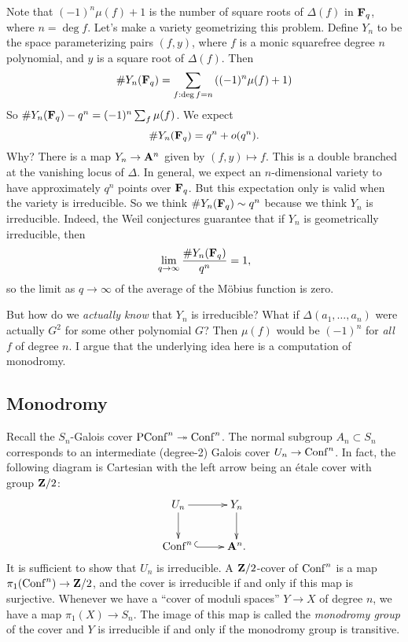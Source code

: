 Note that $(-1)^n\mu(f)+1$ is the number of square roots of $\Delta(f)$ in 
$\mathbf{F}_q$, where $n=\deg f$. Let's make a variety geometrizing this problem. 
Define $Y_n$ to be the space parameterizing pairs $(f,y)$, where $f$ is a monic 
squarefree degree $n$ polynomial, and $y$ is a square root of $\Delta(f)$. Then 
\[
  \#Y_n(\mathbf{F}_q) = \sum_{f:\deg f=n} \left((-1)^n \mu(f) + 1\right)
\]
So $\#Y_n(\mathbf{F}_q) - q^n = (-1)^n \sum_f \mu(f)$. We expect 
\[
  \# Y_n(\mathbf{F}_q) = q^n + o(q^n) .
\]
Why? There is a map $Y_n\to \mathbf{A}^n$ given by $(f,y)\mapsto f$. This is a 
double branched at the vanishing locus of $\Delta$. In general, we expect an 
$n$-dimensional variety to have approximately $q^n$ points over $\mathbf{F}_q$. But 
this expectation only is valid when the variety is irreducible. So we think 
$\# Y_n(\mathbf{F}_q)\sim q^n$ because we think $Y_n$ is irreducible. Indeed, the 
Weil conjectures guarantee that if $Y_n$ is geometrically irreducible, then 
\[
  \lim_{q\to \infty} \frac{\#Y_n(\mathbf{F}_q)}{q^n} = 1 ,
\]
so the limit as $q\to \infty$ of the average of the M\"obius function is zero. 

But how do we \emph{actually know} that $Y_n$ is irreducible? What if 
$\Delta(a_1,\dots,a_n)$ were actually $G^2$ for some other polynomial $G$? 
Then $\mu(f)$ would be $(-1)^n$ for \emph{all} $f$ of degree $n$. I argue that 
the underlying idea here is a computation of monodromy. 





\subsection{Monodromy}

Recall the $S_n$-Galois cover 
$\operatorname{PConf}^n \twoheadrightarrow \operatorname{Conf}^n$. The normal subgroup 
$A_n\subset S_n$ corresponds to an intermediate (degree-2) Galois cover 
$U_n\to \operatorname{Conf}^n$. In fact, the following diagram is Cartesian with 
the left arrow being an \'etale cover with group $\mathbf{Z}/2$:
\[\xymatrix{
  U_n \ar[r] \ar[d] 
    & Y_n \ar[d] \\
  \configuration^n{} \ar@{^{(}->}[r] 
    & \dA^n .
}\]
It is sufficient to show that $U_n$ is irreducible. A $\mathbf{Z}/2$-cover of 
$\operatorname{Conf}^n$ is a map $\pi_1(\operatorname{Conf}^n)\to \mathbf{Z}/2$, and the cover 
is irreducible if and only if this map is surjective. Whenever we have a 
``cover of moduli spaces'' $Y\to X$ of degree $n$, we have a map 
$\pi_1(X)\to S_n$. The image of this map is called the \emph{monodromy group} 
of the cover and $Y$ is irreducible if and only if the monodromy group is 
transitive. 

